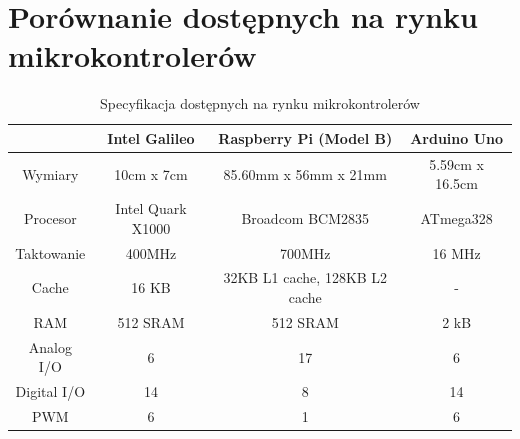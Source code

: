 \documentclass{xmgr}
\begin{document}
\chapter{Porównanie dostępnych na rynku mikrokontrolerów}
\begin{table}[!tbh]
\begin{tabular}{|c|c|c|c|} \hline
 & \textbf{Intel Galileo} & \textbf{Raspberry Pi (Model B)} & \textbf{Arduino Uno} \\ \hline
Wymiary & 10cm x 7cm & 85.60mm x 56mm x 21mm & 5.59cm x 16.5cm \\ \hline
Procesor & Intel Quark X1000 & Broadcom BCM2835 & ATmega328 \\ \hline
Taktowanie & 400MHz	& 700MHz & 16 MHz\\ \hline
Cache & 16 KB & 32KB L1 cache, 128KB L2 cache & - \\ \hline
RAM & 512 SRAM & 512 SRAM & 2 kB \\ \hline
Analog I/O	& 6 & 17 & 6 \\ \hline
Digital I/O	& 14 & 8 & 14 \\ \hline
PWM	& 6 & 1 & 6 \\ \hline
\end{tabular}
\caption{Specyfikacja dostępnych na rynku mikrokontrolerów}
\end{table}
\end{document}
